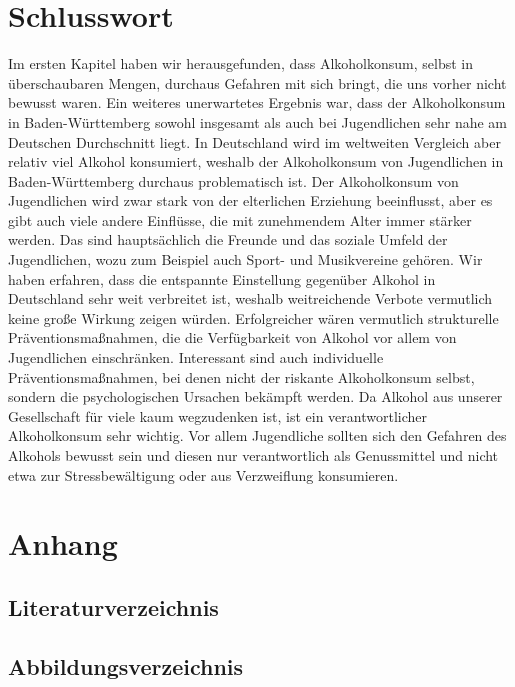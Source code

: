 \documentclass[12pt]{article}
\begin{document}
\clearpage
\section{Schlusswort}
Im ersten Kapitel haben wir herausgefunden, dass Alkoholkonsum, selbst in überschaubaren Mengen, durchaus Gefahren mit sich bringt, die uns vorher nicht bewusst waren. Ein weiteres unerwartetes Ergebnis war, dass der Alkoholkonsum in Baden-Württemberg sowohl insgesamt als auch bei Jugendlichen sehr nahe am Deutschen Durchschnitt liegt. In Deutschland wird im weltweiten Vergleich aber relativ viel Alkohol konsumiert, weshalb der Alkoholkonsum von Jugendlichen in Baden-Württemberg durchaus problematisch ist. Der Alkoholkonsum von Jugendlichen wird zwar stark von der elterlichen Erziehung beeinflusst, aber es gibt auch viele andere Einflüsse, die mit zunehmendem Alter immer stärker werden. Das sind hauptsächlich die Freunde und das soziale Umfeld der Jugendlichen, wozu zum Beispiel auch Sport- und Musikvereine gehören. Wir haben erfahren, dass die entspannte Einstellung gegenüber Alkohol in Deutschland sehr weit verbreitet ist, weshalb weitreichende Verbote vermutlich keine große Wirkung zeigen würden. Erfolgreicher wären vermutlich strukturelle Präventionsmaßnahmen, die die Verfügbarkeit von Alkohol vor allem von Jugendlichen einschränken. Interessant sind auch individuelle Präventionsmaßnahmen, bei denen nicht der riskante Alkoholkonsum selbst, sondern die psychologischen Ursachen bekämpft werden. Da Alkohol aus unserer Gesellschaft für viele kaum wegzudenken ist, ist ein verantwortlicher Alkoholkonsum sehr wichtig. Vor allem Jugendliche sollten sich den Gefahren des Alkohols bewusst sein und diesen nur verantwortlich als Genussmittel und nicht etwa zur Stressbewältigung oder aus Verzweiflung konsumieren.






\clearpage
\section{Anhang}
\clearpage
\subsection{Literaturverzeichnis}
\printbibliography[heading=none]
\subsection{Abbildungsverzeichnis}
\makeatletter{}\makeatother
\lofwithouttitle


\end{document}
